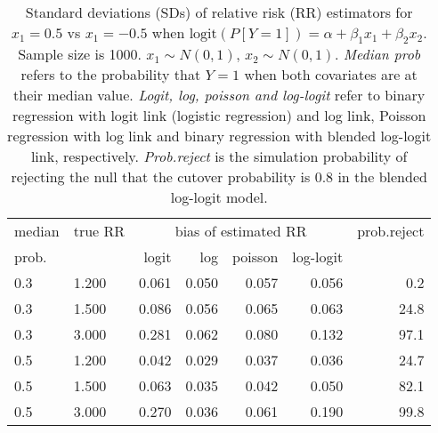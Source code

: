 \documentclass[12pt,a4paper]{article}
\begin{document}
\begin{table}[H] 
\small\sf\centering 
\caption{Standard deviations (SDs) of relative risk (RR) estimators for $x_1=0.5$ vs $x_1=-0.5$ when $\mbox{logit}(P[Y=1])=\alpha+\beta_1 x_1 + \beta_2 x_2$. Sample size is 1000. $x_1 \sim $$N(0,1)$, $x_2 \sim N(0,1)$. {\it Median prob} refers to the probability that $Y=1$ when both covariates are at their median value. {\it Logit, log, poisson and log-logit} refer to binary regression with logit link (logistic regression) and log link, Poisson regression with log link and binary regression with blended log-logit link, respectively. {\it Prob.reject} is the simulation probability of rejecting the null that the cutover probability is $0.8$ in the blended log-logit model.} 
\begin{tabular}{llrrrrr} 
\toprule 
median & true RR & \multicolumn{4}{c}{bias of estimated RR} & prob.reject \\ 
prob. & & logit & log & poisson & log-logit  & \\ \midrule 
0.3 & 1.200 & 0.061 & 0.050 & 0.057 & 0.056 &  0.2 \\  
0.3 & 1.500 & 0.086 & 0.056 & 0.065 & 0.063 & 24.8 \\  
0.3 & 3.000 & 0.281 & 0.062 & 0.080 & 0.132 & 97.1 \\  
0.5 & 1.200 & 0.042 & 0.029 & 0.037 & 0.036 & 24.7 \\  
0.5 & 1.500 & 0.063 & 0.035 & 0.042 & 0.050 & 82.1 \\  
0.5 & 3.000 & 0.270 & 0.036 & 0.061 & 0.190 & 99.8 \\  
\bottomrule 
\end{tabular} 
\end{table} 
\end{document}
